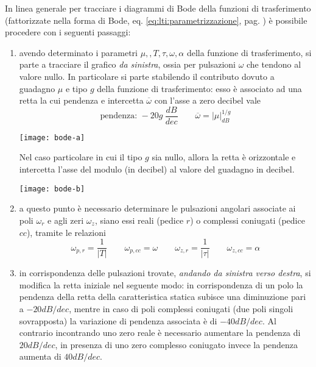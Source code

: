 		In linea generale per tracciare i diagrammi di Bode della funzioni di trasferimento (fattorizzate nella forma di Bode, eq. \ref{eq:lti:parametrizzazione}, pag. \pageref{eq:lti:parametrizzazione}) è possibile procedere con i seguenti passaggi:
		\begin{enumerate}
			\item avendo determinato i parametri $\mu,,T,\tau,\omega,\alpha$ della funzione di trasferimento, si parte a tracciare il grafico \textit{da sinistra}, ossia per pulsazioni $\omega$ che tendono al valore nullo. In particolare si parte stabilendo il contributo dovuto a guadagno $\mu$ e tipo $g$ della funzione di trasferimento: esso è associato ad una retta la cui pendenza e intercetta $\overline \omega$ con l'asse a zero decibel vale
			\[ \textrm{pendenza: } -20 g \ \frac{dB}{dec} \qquad \overline \omega = |\mu|^{1/g}_{dB} \]
			\begin{center}
				\texttt{[image: bode-a]}
			\end{center}
			Nel caso particolare in cui il tipo $g$ sia  nullo, allora la retta è orizzontale e intercetta l'asse del modulo (in decibel) al valore del guadagno in decibel.
			\begin{center}
				\texttt{[image: bode-b]}
			\end{center}
			
			\item a questo punto è necessario determinare le pulsazioni angolari associate ai poli $\omega_r$ e agli zeri $\omega_z$, siano essi reali (pedice $r$) o complessi coniugati (pedice $cc$), tramite le relazioni
			\[ \omega_{p,r} = \frac 1 {|T|} \qquad \omega_{p,cc} = \omega \qquad \omega_{z,r} = \frac 1 {|\tau|} \qquad \omega_{z,cc} = \alpha \]
			
			\item in corrispondenza delle pulsazioni trovate, \textit{andando da sinistra verso destra}, si modifica la retta iniziale nel seguente modo: in corrispondenza di un polo la pendenza della retta della caratteristica statica subisce una diminuzione pari a $-20dB/dec$, mentre in caso di poli complessi coniugati (due poli singoli sovrapposta) la variazione di pendenza associata è di $-40dB/dec$. Al contrario incontrando uno zero reale è necessario aumentare la pendenza di $20dB/dec$, in presenza di uno zero complesso coniugato invece la pendenza aumenta di $40dB/dec$.
			
		\end{enumerate}
			
